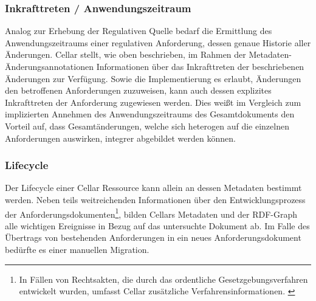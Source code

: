 \subsubsection{Inkrafttreten / Anwendungszeitraum}

Analog zur Erhebung der Regulativen Quelle bedarf die Ermittlung des Anwendungszeitraums einer regulativen Anforderung, dessen genaue Historie aller Änderungen.
Cellar stellt, wie oben beschrieben, im Rahmen der Metadaten-Änderungsannotationen Informationen über das Inkrafttreten der beschriebenen Änderungen zur Verfügung.
Sowie die Implementierung es erlaubt, Änderungen den betroffenen Anforderungen zuzuweisen, kann auch dessen explizites Inkrafttreten der Anforderung zugewiesen werden.
Dies weißt im Vergleich zum implizierten Annehmen des Anwendungszeitraums des Gesamtdokuments den Vorteil auf, dass Gesamtänderungen, welche sich heterogen auf die einzelnen Anforderungen auswirken, integrer abgebildet werden können.

\subsubsection{Lifecycle}

Der Lifecycle einer Cellar Ressource kann allein an dessen Metadaten bestimmt werden.
Neben teils weitreichenden Informationen über den Entwicklungsprozess der Anforderungsdokumenten\footnote{In Fällen von Rechtsakten, die durch das ordentliche Gesetzgebungsverfahren entwickelt wurden, umfasst Cellar zusätzliche Verfahrensinformationen. \cite[vgl.][]{2004R0552}}, bilden Cellars Metadaten und der RDF-Graph alle wichtigen Ereignisse in Bezug auf das untersuchte Dokument ab.  
Im Falle des Übertrags von bestehenden Anforderungen in ein neues Anforderungsdokument bedürfte es einer manuellen Migration.

